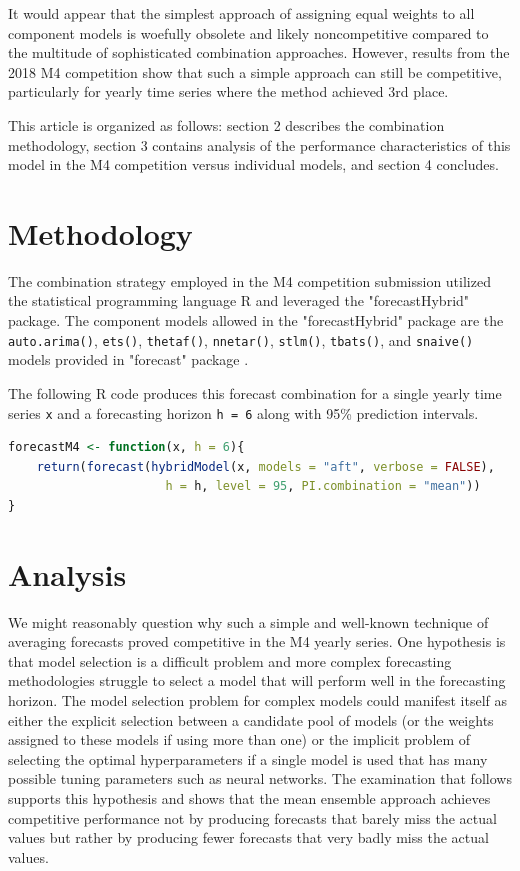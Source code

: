 \documentclass[11pt,3p,review,authoryear]{elsarticle}
\begin{document}
It would appear that the simplest approach of assigning equal weights to all component models is woefully obsolete and likely noncompetitive compared to the multitude of sophisticated combination approaches. However, results from the 2018 M4 competition show that such a simple approach can still be competitive, particularly for yearly time series where the method achieved 3rd place.

This article is organized as follows: section 2 describes the combination methodology, section 3 contains analysis of the performance characteristics of this model in the M4 competition versus individual models, and section 4 concludes.

\section{Methodology}
The combination strategy employed in the M4 competition submission utilized the statistical programming language R \citep{Rlang} and leveraged the "forecastHybrid" \citep{forecastHybrid} package. The component models allowed in the "forecastHybrid" package are the  \lstinline{auto.arima()}, \lstinline{ets()}, \lstinline{thetaf()}, \lstinline{nnetar()}, \lstinline{stlm()}, \lstinline{tbats()}, and \lstinline{snaive()} models provided in "forecast" package \citep{Forecast}.


The following R code produces this forecast combination for a single yearly time series \lstinline{x} and a forecasting horizon \lstinline{h = 6} along with 95\% prediction intervals.
\begin{lstlisting}[language=R]
forecastM4 <- function(x, h = 6){
    return(forecast(hybridModel(x, models = "aft", verbose = FALSE),
                      h = h, level = 95, PI.combination = "mean"))
}
\end{lstlisting}

\section{Analysis}
We might reasonably question why such a simple and well-known technique of averaging forecasts proved competitive in the M4 yearly series. One hypothesis is that model selection is a difficult problem and more complex forecasting methodologies struggle to select a model that will perform well in the forecasting horizon. The model selection problem for complex models could manifest itself as either the explicit selection between a candidate pool of models (or the weights assigned to these models if using more than one) or the implicit problem of selecting the optimal hyperparameters if a single model is used that has many possible tuning parameters such as neural networks. The examination that follows supports this hypothesis and shows that the mean ensemble approach achieves competitive performance not by producing forecasts that barely miss the actual values but rather by producing fewer forecasts that very badly miss the actual values.
\end{document}
